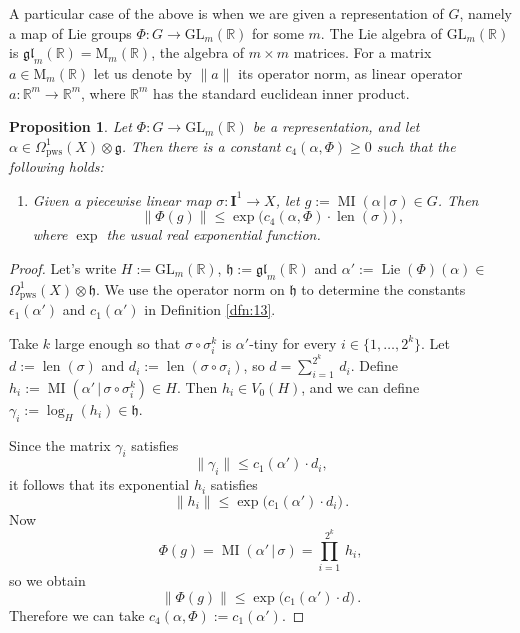 \documentclass[10pt, a4paper]{amsart}
\newtheorem{prop}[equation]{Proposition}
\theoremstyle{definition}
\numberwithin{equation}{section}
\newcommand{\opn}{\operatorname}
\newcommand{\mfrak}[1]{\mathfrak{#1}}
\newcommand{\mbf}[1]{\mathbf{#1}}
\newcommand{\mrm}[1]{\mathrm{#1}}
\newcommand{\mbb}[1]{\mathbb{#1}}
\newcommand{\norm}[1]{\lVert #1 \rVert}
\renewcommand{\vert}{\, | \,}
\newcommand{\R}{\mbb{R}}
\newcommand{\g}{\mfrak{g}}
\newcommand{\h}{\mfrak{h}}
\newcommand{\lb}{\linebreak}
\begin{document}
A particular case of the above is when we are given a representation of $G$,
namely a map of Lie groups 
$\Phi : G \to \mrm{GL}_m(\R)$ for some $m$. 
The Lie algebra of $\mrm{GL}_m(\R)$ is
$\mfrak{gl}_m(\R) = \mrm{M}_m(\R)$, the algebra of $m \times m$ matrices.
For a matrix $a \in \mrm{M}_m(\R)$ let us denote by $\norm{a}$ its operator
norm, as linear operator $a : \R^m \to \R^m$, 
where $\R^m$ has the standard euclidean inner product.

\begin{prop} \label{prop:4}
Let $\Phi : G \to \mrm{GL}_m(\R)$ be a representation, and let
$\alpha \in \Omega^1_{\mrm{pws}}(X) \otimes \g$.
Then there is a constant $c_4(\alpha, \Phi) \geq 0$ such that the following
holds:
\begin{enumerate}
\item[($*$)] Given a piecewise linear map
$\sigma : \mbf{I}^{1} \to X$, let 
$g := \opn{MI}(\alpha \vert \sigma) \in G$.
Then
\[ \norm{ \Phi(g) } \leq \exp \bigl( c_4(\alpha, \Phi) \cdot
\opn{len}(\sigma)
\bigr) \, , \]
where $\exp$ the usual real exponential function.
\end{enumerate}
\end{prop}

\begin{proof}
Let's write $H := \mrm{GL}_m(\R)$,
$\h := \mfrak{gl}_m(\R)$ and
$\alpha' := \opn{Lie}(\Phi)(\alpha) \in$ \lb 
$\Omega^1_{\mrm{pws}}(X) \otimes \h$. 
We use the operator norm on $\h$ to determine the constants 
$\epsilon_1(\alpha')$ and $c_1(\alpha')$ in
Definition \ref{dfn:13}.

Take $k$ large enough so that $\sigma \circ \sigma^k_i$ is $\alpha'$-tiny
for every $i \in \{ 1, \ldots, 2^k \}$. 
Let $d := \opn{len}(\sigma)$ and $d_i := \opn{len}(\sigma \circ \sigma_i)$,
so $d = \sum_{i = 1}^{2^k}  \, d_i$.
Define $h_i := \opn{MI}(\alpha' \vert \sigma \circ \sigma^k_i) \in H$. 
Then $h_i \in V_0(H)$, and we can define 
$\gamma_i := \log_{H} (h_i) \in \h$.

Since the matrix $\gamma_i$ satisfies
\[ \norm{ \gamma_i } \leq c_1(\alpha') \cdot d_i , \]
it follows that its exponential $h_i$ satisfies
\[ \norm{ h_i } \leq \exp \bigl( c_1(\alpha') \cdot d_i \bigr) \, . \]
Now 
\[ \Phi(g) = \opn{MI}(\alpha' \vert \sigma) = \prod_{i = 1}^{2^k}  \, h_i , \]
so we obtain
\[ \norm{\Phi(g)} \leq \exp \bigl( c_1(\alpha') \cdot d \bigr) \, . \]
Therefore we can take 
$c_4(\alpha, \Phi) := c_1(\alpha')$.
\end{proof}
\end{document}
